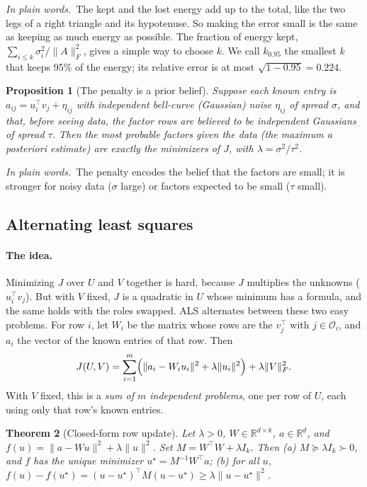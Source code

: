 \documentclass[10pt]{article}
\theoremstyle{plain}
\newtheorem{theorem}{Theorem}[section]
\newtheorem{proposition}[theorem]{Proposition}
\theoremstyle{definition}
\theoremstyle{remark}
\newcommand{\R}{\mathbb{R}}
\newcommand{\T}{^{\top}}
\newcommand{\fro}[1]{\lVert #1\rVert_F}
\newcommand{\norm}[1]{\lVert #1\rVert}
\newcommand{\obs}{\mathcal{O}}
\newcommand{\plain}{\noindent\emph{In plain words.}\ }
\begin{document}
\plain The kept and the lost energy add up to the total, like the two legs of a right triangle and its hypotenuse. So making the error small is the same as keeping as much energy as possible. The fraction of energy kept, $\sum_{i\le k}\sigma_i^2/\fro A^2$, gives a simple way to choose $k$. We call $k_{0.95}$ the smallest $k$ that keeps 95\% of the energy; its relative error is at most $\sqrt{1-0.95}=0.224$.

\begin{proposition}[The penalty is a prior belief]\label{prop:map}
Suppose each known entry is $a_{ij}=u_i\T v_j+\eta_{ij}$ with independent bell-curve (Gaussian) noise $\eta_{ij}$ of spread $\sigma$, and that, before seeing data, the factor rows are believed to be independent Gaussians of spread $\tau$. Then the most probable factors given the data (the \emph{maximum a posteriori} estimate) are exactly the minimizers of $J$, with $\lambda=\sigma^2/\tau^2$.
\end{proposition}

\plain The penalty encodes the belief that the factors are small; it is stronger for noisy data ($\sigma$ large) or factors expected to be small ($\tau$ small).

\subsection{Alternating least squares}
\label{sec:als}

\paragraph{The idea.}
Minimizing $J$ over $U$ and $V$ together is hard, because $J$ multiplies the unknowns ($u_i\T v_j$). But with $V$ fixed, $J$ is a quadratic in $U$ whose minimum has a formula, and the same holds with the roles swapped. ALS alternates between these two easy problems. For row $i$, let $W_i$ be the matrix whose rows are the $v_j\T$ with $j\in\obs_i$, and $a_i$ the vector of the known entries of that row. Then
\begin{equation}\label{eq:Jsplit}
J(U,V)=\sum_{i=1}^m\Bigl(\norm{a_i-W_iu_i}^2+\lambda\norm{u_i}^2\Bigr)+\lambda\fro{V}^2 .
\end{equation}
With $V$ fixed, this is a \emph{sum of $m$ independent problems}, one per row of $U$, each using only that row's known entries.

\begin{theorem}[Closed-form row update]\label{thm:row}
Let $\lambda>0$, $W\in\R^{d\times k}$, $a\in\R^d$, and $f(u)=\norm{a-Wu}^2+\lambda\norm u^2$. Set $M=W\T W+\lambda I_k$. Then
(a) $M\succeq\lambda I_k\succ0$, and $f$ has the unique minimizer $u^\star=M^{-1}W\T a$;
(b) for all $u$, $f(u)-f(u^\star)=(u-u^\star)\T M(u-u^\star)\ge\lambda\norm{u-u^\star}^2$.
\end{theorem}
\end{document}
